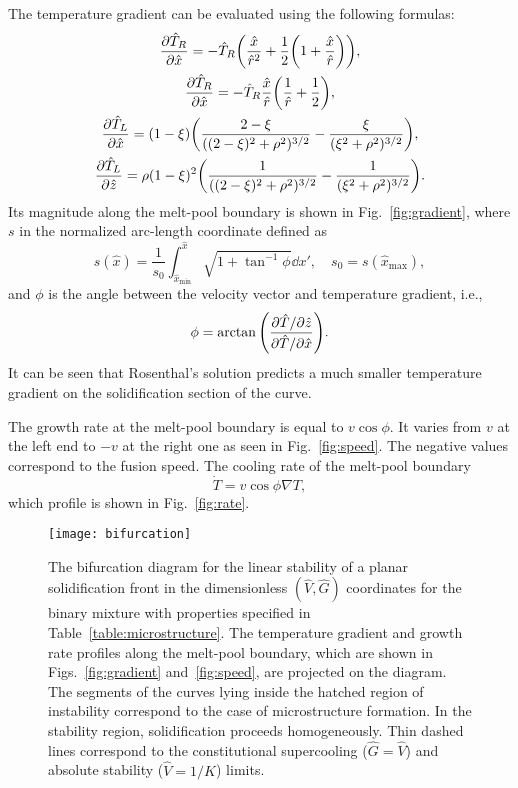 \documentclass{article}
\begin{document}
The temperature gradient can be evaluated using the following formulas:
\begin{gather}
    \pdv{\hat{T}_R}{\hat{x}} =
        -\hat{T}_R\qty( \frac{\hat{x}}{\hat{r}^2} + \frac12\qty(1 + \frac{\hat{x}}{\hat{r}}) ), \label{eq:dTRdx}\\
    \pdv{\hat{T}_R}{\hat{x}} =
        -\hat{T}_R\frac{\hat{x}}{\hat{r}}\qty( \frac1{\hat{r}} + \frac12 ), \label{eq:dTRdz}\\
    \pdv{\hat{T}_L}{\hat{x}} =
        (1-\xi)\qty( \frac{2-\xi}{((2-\xi)^2 + \rho^2)^{3/2}} - \frac{\xi}{(\xi^2 + \rho^2)^{3/2}} ), \label{eq:dTLdx}\\
    \pdv{\hat{T}_L}{\hat{z}} =
        \rho(1-\xi)^2\qty( \frac1{((2-\xi)^2 + \rho^2)^{3/2}} - \frac1{(\xi^2 + \rho^2)^{3/2}} ). \label{eq:dTLdz}
\end{gather}
Its magnitude along the melt-pool boundary is shown in Fig.~\ref{fig:gradient},
where $s$ in the normalized arc-length coordinate defined as
\begin{equation}\label{eq:s}
    s(\hat{x}) = \frac1{s_0}\int_{\hat{x}_\text{min}}^{\hat{x}}\sqrt{1+\tan^{-1}\phi}\dd{x}',
        \quad s_0 = s(\hat{x}_\text{max}),
\end{equation}
and $\phi$ is the angle between the velocity vector and temperature gradient, i.e.,
\begin{equation}\label{eq:phi}
    \phi = \arctan\qty(\frac{\partial\hat{T}/\partial\hat{z}}{\partial\hat{T}/\partial\hat{x}}).
\end{equation}
It can be seen that Rosenthal's solution predicts a much smaller temperature gradient
on the solidification section of the curve.

The growth rate at the melt-pool boundary is equal to $v\cos\phi$.
It varies from $v$ at the left end to $-v$ at the right one as seen in Fig.~\ref{fig:speed}.
The negative values correspond to the fusion speed.
The cooling rate of the melt-pool boundary
\begin{equation}\label{eq:dotT}
    \dot{T} = v\cos\phi\nabla T,
\end{equation}
which profile is shown in Fig.~\ref{fig:rate}.

\begin{figure}
    \centering
    \texttt{[image: bifurcation]}
    \caption{
        The bifurcation diagram for the linear stability of a planar solidification front
        in the dimensionless $(\hat{V},\hat{G})$ coordinates for the binary mixture
        with properties specified in Table~\ref{table:microstructure}.
        The temperature gradient and growth rate profiles along the melt-pool boundary,
        which are shown in Figs.~\ref{fig:gradient} and~\ref{fig:speed}, are projected on the diagram.
        The segments of the curves lying inside the hatched region of instability correspond to the case
        of microstructure formation. In the stability region, solidification proceeds homogeneously.
        Thin dashed lines correspond to the constitutional supercooling ($\hat{G} = \hat{V}$)
        and absolute stability ($\hat{V} = 1/K$) limits.
    }\label{fig:bifurcation}
\end{figure}
\end{document}
